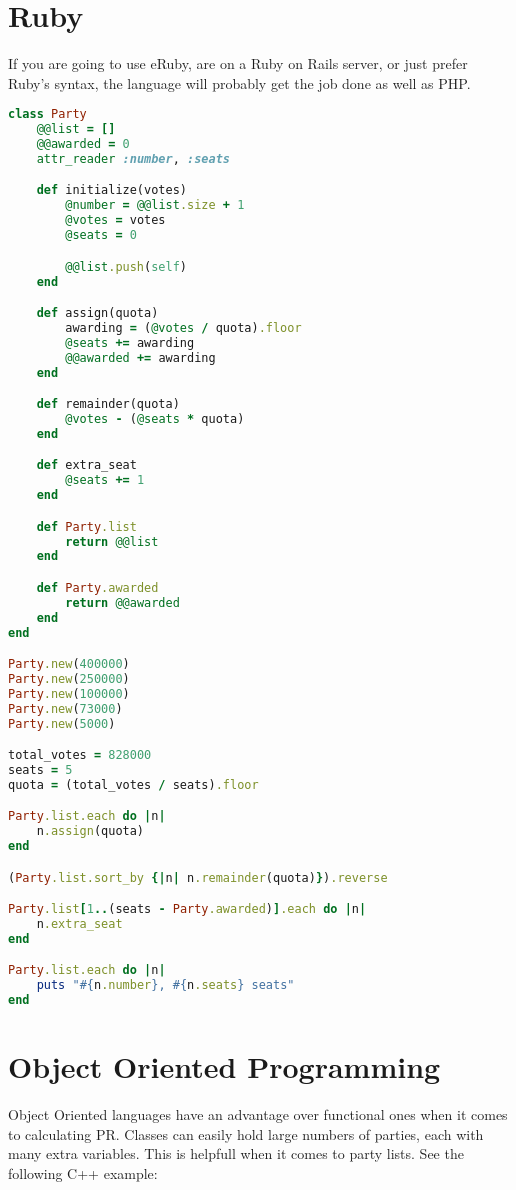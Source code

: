 \documentclass{article}
\begin{document}
    \section{Ruby}

    If you are going to use eRuby, are on a Ruby on Rails server, or just prefer Ruby's syntax, the language will probably get the job done as well as PHP.

    \begin{lstlisting}[language=Ruby]
class Party
    @@list = []
    @@awarded = 0
    attr_reader :number, :seats

    def initialize(votes)
        @number = @@list.size + 1
        @votes = votes
        @seats = 0

        @@list.push(self)
    end

    def assign(quota)
        awarding = (@votes / quota).floor
        @seats += awarding
        @@awarded += awarding
    end

    def remainder(quota)
        @votes - (@seats * quota)
    end

    def extra_seat
        @seats += 1
    end

    def Party.list
        return @@list
    end

    def Party.awarded
        return @@awarded
    end
end

Party.new(400000)
Party.new(250000)
Party.new(100000)
Party.new(73000)
Party.new(5000)

total_votes = 828000
seats = 5
quota = (total_votes / seats).floor

Party.list.each do |n|
    n.assign(quota)
end

(Party.list.sort_by {|n| n.remainder(quota)}).reverse

Party.list[1..(seats - Party.awarded)].each do |n|
    n.extra_seat
end

Party.list.each do |n|
    puts "#{n.number}, #{n.seats} seats"
end
    \end{lstlisting}

    \section{Object Oriented Programming}

    Object Oriented languages have an advantage over functional ones when it comes to calculating PR. Classes can easily hold large numbers of parties, each with many extra variables. This is helpfull when it comes to party lists. See the following C++ example:
\end{document}

